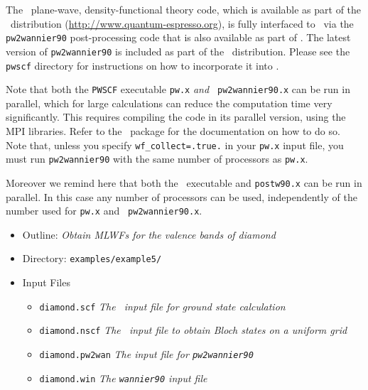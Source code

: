 \documentclass[a4paper,11pt,twoside]{article}
\begin{document}
The \pwscf\ plane-wave, density-functional theory code, which is
available as part of the \QE\ distribution (\url{http://www.quantum-espresso.org}), is fully interfaced to \wannier\ via the
{\tt pw2wannier90} post-processing code that is also available as part
of \QE. The latest version of {\tt pw2wannier90} is included as part of 
the \wannier\ distribution. Please see the {\tt pwscf} directory for 
instructions on how to incorporate it into \pwscf. 

Note that both the {\tt PWSCF} executable {\tt pw.x} {\it and} {\tt
  pw2wannier90.x} can be run in parallel, which for large calculations
can reduce the computation time very significantly.  This requires
compiling the code in its parallel version, using the MPI
libraries. Refer to the \QE\ package for the documentation on how to
do so.  Note that, unless you specify {\tt wf\_collect=.true.} in your
{\tt pw.x} input file, you must run {\tt pw2wannier90} with the same
number of processors as {\tt pw.x}.

Moreover we remind here that both the \wannier\ executable and {\tt postw90.x} can be run in
parallel. In this case any number of processors can be used,
independently of the number used for {\tt pw.x} and {\tt
  pw2wannier90.x}.


\begin{itemize}
\item{Outline: \it{Obtain MLWFs for the valence bands of diamond}}
\item{Directory: {\tt examples/example5/}}
\item{Input Files}
\begin{itemize}
\item{ {\tt diamond.scf}  {\it The \pwscf\ input file for ground state
    calculation}} 
\item{ {\tt diamond.nscf}  {\it The \pwscf\ input file to obtain Bloch
    states on a uniform grid}} 
\item{ {\tt diamond.pw2wan}  {\it The input file for {\tt pw2wannier90}}}
\item{ {\tt diamond.win}  {\it The {\tt wannier90} input file}}
\end{itemize}
\end{itemize}
\end{document}

